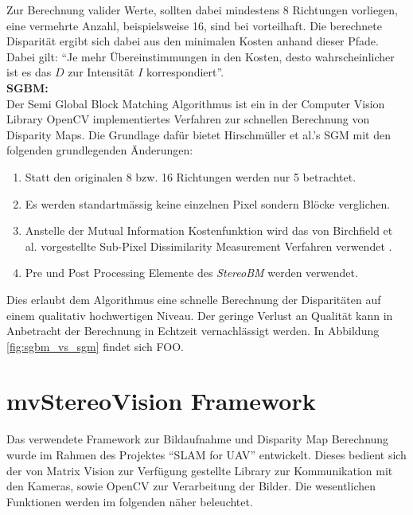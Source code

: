 \noindent
Zur Berechnung valider Werte, sollten dabei mindestens 8 Richtungen vorliegen, eine vermehrte Anzahl, beispielsweise 16, sind bei vorteilhaft. Die berechnete Disparität ergibt sich dabei aus den minimalen Kosten anhand dieser Pfade. Dabei gilt: “Je mehr Übereinstimmungen in den Kosten, desto wahrscheinlicher ist es das $D$ zur Intensität $I$ korrespondiert”.\\

\noindent
\textbf{SGBM:} \\
Der Semi Global Block Matching Algorithmus ist ein in der Computer Vision Library OpenCV implementiertes Verfahren zur schnellen Berechnung von Disparity Maps. Die Grundlage dafür bietet Hirschmüller et al.’s SGM \cite{hirschmueller2008sgm} mit den folgenden grundlegenden Änderungen:

\begin{enumerate}[label=C.\arabic*]
	\item Statt den originalen 8 bzw. 16 Richtungen werden nur 5 betrachtet. \label{item:differences_directions}
	\item Es werden  standartm\"assig keine einzelnen Pixel sondern Blöcke verglichen. \label{item:differences_matching}
	\item Anstelle der Mutual Information Kostenfunktion wird das von Birchfield et al. vorgestellte Sub-Pixel Dissimilarity Measurement Verfahren verwendet \cite{birchfield-tomasi}.
	\item Pre und Post Processing Elemente des \emph{StereoBM} \cite{opencv_doc} werden verwendet.
\end{enumerate}

\noindent
Dies erlaubt dem Algorithmus eine schnelle Berechnung der Disparitäten auf einem qualitativ hochwertigen Niveau. Der geringe Verlust an Qualität kann in Anbetracht der Berechnung in Echtzeit vernachlässigt werden. In Abbildung \ref{fig:sgbm_vs_sgm} findet sich FOO.


\section{mvStereoVision Framework}
\label{sec:framework}
Das verwendete Framework zur Bildaufnahme und Disparity Map Berechnung wurde im Rahmen des Projektes “SLAM for UAV” entwickelt. Dieses bedient sich der von Matrix Vision zur Verfügung gestellte Library \cite{matrixvision} zur Kommunikation mit den Kameras, sowie OpenCV \cite{opencv} zur Verarbeitung der Bilder. Die wesentlichen Funktionen werden im folgenden näher beleuchtet.



